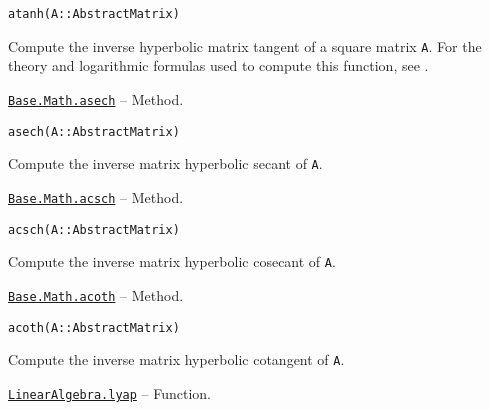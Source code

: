 \begin{adjustwidth}{2em}{0pt}


\begin{verbatim}
atanh(A::AbstractMatrix)
\end{verbatim}

Compute the inverse hyperbolic matrix tangent of a square matrix \texttt{A}.  For the theory and logarithmic formulas used to compute this function, see \footnotemark[17].



\end{adjustwidth}
\hypertarget{2354446395483966696}{} 
\hyperlink{2354446395483966696}{\texttt{Base.Math.asech}}  -- {Method.}

\begin{adjustwidth}{2em}{0pt}


\begin{verbatim}
asech(A::AbstractMatrix)
\end{verbatim}

Compute the inverse matrix hyperbolic secant of \texttt{A}. 



\end{adjustwidth}
\hypertarget{1360680038198884316}{} 
\hyperlink{1360680038198884316}{\texttt{Base.Math.acsch}}  -- {Method.}

\begin{adjustwidth}{2em}{0pt}


\begin{verbatim}
acsch(A::AbstractMatrix)
\end{verbatim}

Compute the inverse matrix hyperbolic cosecant of \texttt{A}. 



\end{adjustwidth}
\hypertarget{12006952808365013482}{} 
\hyperlink{12006952808365013482}{\texttt{Base.Math.acoth}}  -- {Method.}

\begin{adjustwidth}{2em}{0pt}


\begin{verbatim}
acoth(A::AbstractMatrix)
\end{verbatim}

Compute the inverse matrix hyperbolic cotangent of \texttt{A}. 



\end{adjustwidth}
\hypertarget{13191775510498989455}{} 
\hyperlink{13191775510498989455}{\texttt{LinearAlgebra.lyap}}  -- {Function.}

